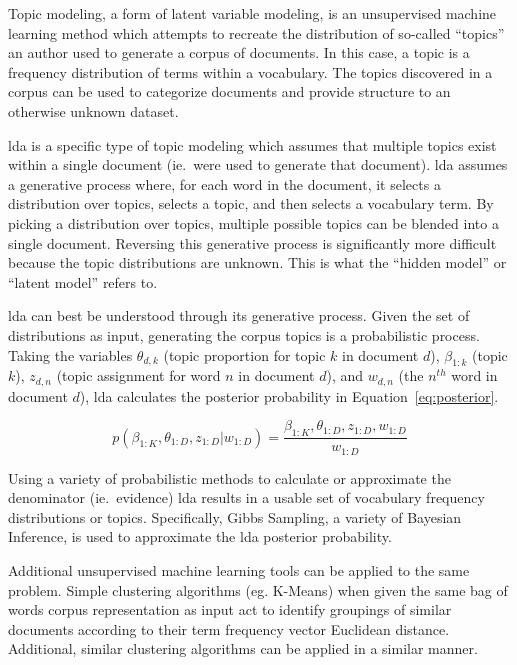 Topic modeling, a form of latent variable modeling, is an unsupervised
machine learning method which attempts to recreate the distribution of
so-called ``topics'' an author used to generate a corpus of documents. In
this case, a topic is a frequency distribution of terms within a
vocabulary. The topics discovered in a corpus can be used to categorize
documents and provide structure to an otherwise unknown dataset.

\ac{lda} is a specific type of topic modeling which assumes that multiple
topics exist within a single document (ie.\ were used to generate that
document). \citep{Blei2003} \ac{lda} assumes a generative process where,
for each word in the document, it selects a distribution over topics,
selects a topic, and then selects a vocabulary term. \citep{Blei2003} By
picking a distribution over topics, multiple possible topics can be blended
into a single document. Reversing this generative process is significantly
more difficult because the topic distributions are unknown. This is what
the ``hidden model'' or ``latent model'' refers to.

\ac{lda} can best be understood through its generative process. Given the
set of distributions as input, generating the corpus topics is a
probabilistic process. Taking the variables $\theta_{d,k}$ (topic
proportion for topic $k$ in document $d$), $\beta_{1:k}$ (topic $k$),
$z_{d,n}$ (topic assignment for word $n$ in document $d$), and
$w_{d,n}$ (the $n^{th}$ word in document $d$), \ac{lda} calculates the
posterior probability in Equation~\ref{eq:posterior}. \citep{Blei2012}

\begin{equation}
p(\beta_{1:K}, \theta_{1:D},z_{1:D} | w_{1:D}) = \frac{\beta_{1:K},
\theta_{1:D},z_{1:D}, w_{1:D}}{w_{1:D}}
\label{eq:posterior}
\end{equation}

\noindent
Using a variety of probabilistic methods to calculate or approximate the
denominator (ie.\ evidence) \ac{lda} results in a usable set of vocabulary
frequency distributions or topics. Specifically, Gibbs Sampling, a variety
of Bayesian Inference, is used to approximate the \ac{lda} posterior
probability.\cite{Blei2003}

Additional unsupervised machine learning tools can be applied to the same
problem. Simple clustering algorithms (eg. K-Means) when given the same bag
of words corpus representation as input act to identify groupings of
similar documents according to their term frequency vector Euclidean
distance. \cite{lloyd1982} Additional, similar clustering algorithms can be
applied in a similar manner.
